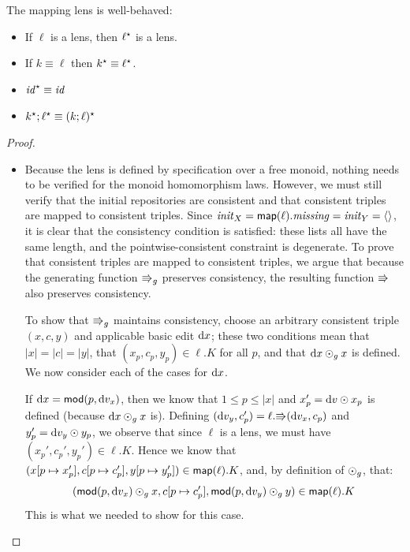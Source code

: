\begin{lemma}
    The mapping lens is well-behaved:
    \begin{itemize}
        \item If $\ell$ is a lens, then $\ell^\star$ is a lens.
        \item If $k\equiv\ell$ then $k^\star\equiv\ell^\star$.
        \item $\mathit{id}^\star\equiv\mathit{id}$
        \item $k^\star;\ell^\star\equiv(k;\ell)^\star$
    \end{itemize}
    \label{lemma:map-functor}
\end{lemma}
\begin{proof}\ 

    \begin{itemize}
        \item Because the lens is defined by specification over a free
            monoid, nothing needs to be verified for the monoid homomorphism
            laws. However, we must still verify that the initial
            repositories are consistent and that consistent triples are
            mapped to consistent triples. Since $\mathit{init}_X =
            \mathsf{map}(\ell).\mathit{missing} = \mathit{init}_Y = \left<\right>$, it is clear that
            the consistency condition is satisfied: these lists all have the
            same length, and the pointwise-consistent constraint is
            degenerate. To prove that consistent triples are mapped to
            consistent triples, we argue that because the generating
            function $\mathord{\Rrightarrow}_g$ preserves consistency, the resulting
            function $\mathord{\Rrightarrow}$ also preserves consistency.

            To show that $\mathord{\Rrightarrow}_g$ maintains consistency, choose an
            arbitrary consistent triple $(x,c,y)$ and applicable basic edit
            $\textrm{d} x$; these two conditions mean that $|x| = |c| = |y|$, that
            $(x_p,c_p,y_p) \in \ell.K$ for all $p$, and that $\textrm{d} x \odot_g x$
            is defined. We now consider each of the cases for $\textrm{d} x$.

            If $\textrm{d} x = \mathsf{mod}(p,\textrm{d} v_x)$, then we know that $1 \le p \le |x|$ and
            $x_p'=\textrm{d} v \odot x_p$ is defined (because $\textrm{d} x \odot_g x$ is).
            Defining $(\textrm{d} v_y,c_p') = \ell.\mathord{\Rrightarrow}(\textrm{d} v_x,c_p)$ and
            $y_p'=\textrm{d} v_y \odot y_p$, we observe that since $\ell$ is a lens, we
            must have $(x_p',c_p',y_p') \in \ell.K$. Hence we know that
            $(x[p \mapsto x_p'],c[p \mapsto c_p'],y[p \mapsto y_p']) \in
            \mathsf{map}(\ell).K$, and, by definition of $\odot_g$, that:
            \[(\mathsf{mod}(p,\textrm{d} v_x) \odot_g x,c[p \mapsto c_p'],\mathsf{mod}(p,\textrm{d} v_y)
            \odot_g y) \in \mathsf{map}(\ell).K\]
            This is what we needed to show for this case.


\end{itemize}
\end{proof}
